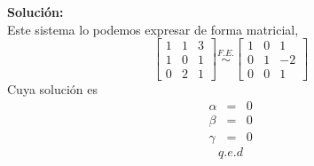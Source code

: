 \documentclass[12pt]{article}
\newenvironment{solucion}
{\begin{mdframed}[backgroundcolor=black!10]
		{\bf Solución:}\\
	}
	{
	\end{mdframed}
}
\newenvironment{preguntas}
{\begin{enumerate}\itemsep12pt
	}
	{
	\end{enumerate}
}
\begin{document}
\begin{preguntas}
\begin{solucion}
		Este sistema lo podemos expresar de forma matricial,
		$$\begin{bmatrix}
		1 & 1 & 3\\
		1 & 0 & 1 \\
		0 & 2 & 1
		\end{bmatrix} \stackrel{F.E.}{\sim} \begin{bmatrix}
		1 & 0 & 1\\
		0 & 1 & -2\\
		0 & 0 & 1
		\end{bmatrix}$$
		Cuya solución es
		$$\begin{array}{rcl}
		\alpha & = & 0\\
		\beta & = & 0\\
		\gamma & = & 0
		\end{array}$$
		$$q.e.d$$
	

\end{solucion}
\end{preguntas}
\end{document}
